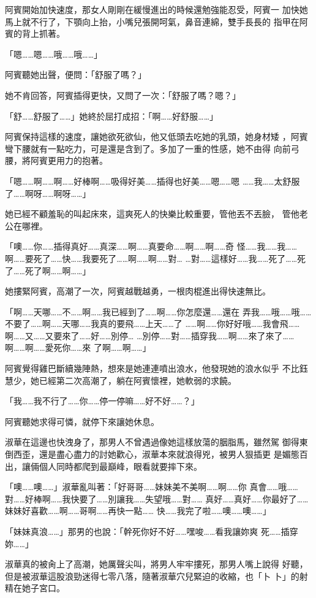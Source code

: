阿賓開始加快速度，那女人剛剛在緩慢進出的時候還勉強能忍受，阿賓一
加快她馬上就不行了，下顎向上抬，小嘴兒張開呵氣，鼻音連綿，雙手長長的
指甲在阿賓的背上抓著。

「嗯……嗯……哦……哦……」

阿賓聽她出聲，便問：「舒服了嗎？」

她不肯回答，阿賓插得更快，又問了一次：「舒服了嗎？嗯？」

「舒……舒服了……」她終於屈打成招：「啊……好舒服……」

阿賓保持這樣的速度，讓她欲死欲仙，他又低頭去吃她的乳頭，她身材矮
，阿賓彎下腰就有一點吃力，可是還是含到了。多加了一重的性感，她不由得
向前弓腰，將阿賓更用力的抱著。

「嗯……啊……啊……好棒啊……吸得好美……插得也好美……嗯……嗯
……我……太舒服了……啊呀……啊呀……」

她已經不顧羞恥的叫起床來，這爽死人的快樂比較重要，管他丟不丟臉，
管他老公在哪裡。

「噢……你……插得真好……真深……啊……真要命……啊……啊……奇
怪……我……我……啊……要死了……快……我要死了……啊……啊……對…
…對……這樣好……我……死了……死了……死了啊……啊……」

她摟緊阿賓，高潮了一次，阿賓越戰越勇，一根肉棍進出得快速無比。

「啊……天哪……不……啊……我已經到了……啊……你怎麼還……還在
弄我……哦……哦……不要了……啊……天哪……我真的要飛……上天……了
……啊……你好好哦……我會飛……啊……又……又要來了……好……別停…
…別停……對……插穿我……啊……來了來了……啊……啊……愛死你……來
了啊……啊……」

阿賓覺得雞巴斷續幾陣熱，想來是她連連噴出浪水，他發現她的浪水似乎
不比鈺慧少，她已經第二次高潮了，躺在阿賓懷裡，她軟弱的求饒。

「我……我不行了……你……停一停嘛……好不好……？」

阿賓聽她求得可憐，就停下來讓她休息。

淑華在這邊也快洩身了，那男人不曾遇過像她這樣放蕩的胭脂馬，雖然駕
御得東倒西歪，還是盡心盡力的討她歡心，淑華本來就浪得兇，被男人狠插更
是媚態百出，讓倆個人同時都爬到最巔峰，眼看就要摔下來。

「噢……噢……」淑華亂叫著：「好哥哥……妹妹美不美啊……啊……你
真會……哦……對……好棒啊……我快要了……別讓我……失望哦……對……
真好……真好……你最好了……妹妹好喜歡……啊……哥啊……再快一點……
快……我完了啦……噢……噢……」

「妹妹真浪……」那男的也說：「幹死你好不好……嘿唆……看我讓妳爽
死……插穿妳……」

淑華真的被肏上了高潮，她厲聲尖叫，將男人牢牢摟死，那男人嘴上說得
好聽，但是被淑華這股浪勁迷得七零八落，隨著淑華穴兒緊迫的收縮，也「卜
卜」的射精在她子宮口。

